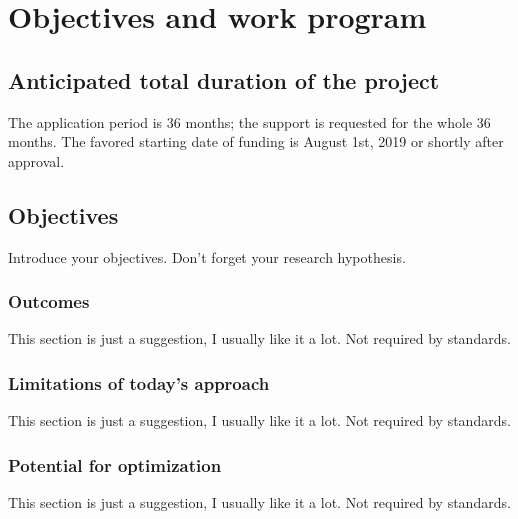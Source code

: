 \section{Objectives and work program}
\label{sec:objectives_and_work_programme}

\subsection{Anticipated total duration of the project}
\label{sec:anticipated_total_duration_of_the_project}
The application period is 36 months; the support is requested for the whole 36 months. 
The favored starting date of funding is August 1st, 2019 or shortly after approval.


\subsection{Objectives}
\label{sec:objectives}

Introduce your objectives. Don't forget your research hypothesis.

\subsubsection{Outcomes}

This section is just a suggestion, I usually like it a lot. Not required by standards.

\subsubsection{Limitations of today's approach}

This section is just a suggestion, I usually like it a lot. Not required by standards.

\subsubsection{Potential for optimization} \label{sec:objectives:motivation}

This section is just a suggestion, I usually like it a lot. Not required by standards.